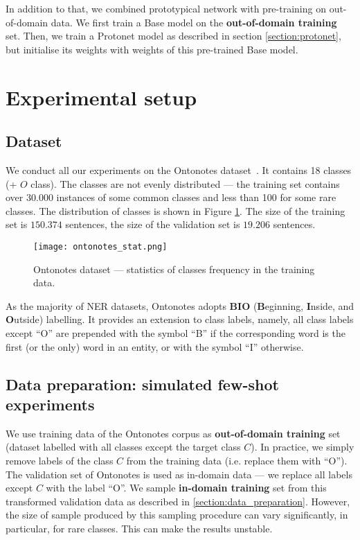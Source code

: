 In addition to that, we combined prototypical network with pre-training on out-of-domain data. We first train a Base model on the \textbf{out-of-domain training} set. Then, we train a Protonet model as described in section \ref{section:protonet}, but initialise its weights with weights of this pre-trained Base model.

\section{Experimental setup}

\subsection{Dataset}

We conduct all our experiments on the Ontonotes dataset~\cite{ontonotes}. It contains 18 classes (+ $O$ class). The classes are not evenly distributed --- the training set contains over $30.000$ instances of some common classes and less than 100 for some rare classes. The distribution of classes is shown in Figure \ref{fig:ontonotes_stat}. The size of the training set is $150.374$ sentences, the size of the validation set is $19.206$ sentences.

\begin{figure}
	\centering
	\texttt{[image: ontonotes\_stat.png]}
	\caption{Ontonotes dataset --- statistics of classes frequency in the training data.}
	\label{fig:ontonotes_stat}
\end{figure}

As the majority of NER datasets, Ontonotes adopts \textbf{BIO} (\textbf{B}eginning, \textbf{I}nside, and \textbf{O}utside) labelling. It provides an extension to class labels, namely, all class labels except ``O'' are prepended with the symbol ``B'' if the corresponding word is the first (or the only) word in an entity, or with the symbol ``I'' otherwise.

\subsection{Data preparation: simulated few-shot experiments}

We use training data of the Ontonotes corpus as \textbf{out-of-domain training} set (dataset labelled with all classes except the target class $C$). In practice, we simply remove labels of the class $C$ from the training data (i.e. replace them with ``O''). The validation set of Ontonotes is used as in-domain data --- we replace all labels except $C$ with the label ``O''. We sample \textbf{in-domain training} set from this transformed validation data as described in \ref{section:data_preparation}. However, the size of sample produced by this sampling procedure can vary significantly, in particular, for rare classes. This can make the results unstable.

